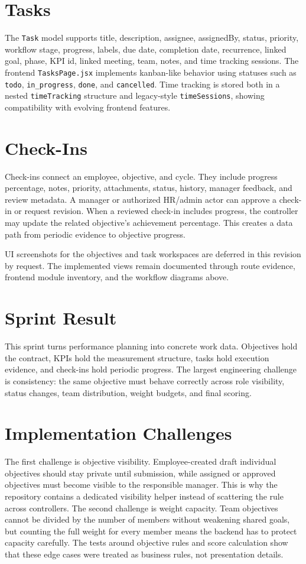 \section{Tasks}
The \texttt{Task} model supports title, description, assignee, assignedBy, status, priority, workflow stage, progress, labels, due date, completion date, recurrence, linked goal, phase, KPI id, linked meeting, team, notes, and time tracking sessions. The frontend \texttt{TasksPage.jsx} implements kanban-like behavior using statuses such as \texttt{todo}, \texttt{in\_progress}, \texttt{done}, and \texttt{cancelled}. Time tracking is stored both in a nested \texttt{timeTracking} structure and legacy-style \texttt{timeSessions}, showing compatibility with evolving frontend features.

\section{Check-Ins}
Check-ins connect an employee, objective, and cycle. They include progress percentage, notes, priority, attachments, status, history, manager feedback, and review metadata. A manager or authorized HR/admin actor can approve a check-in or request revision. When a reviewed check-in includes progress, the controller may update the related objective's achievement percentage. This creates a data path from periodic evidence to objective progress.



UI screenshots for the objectives and task workspaces are deferred in this revision by request. The implemented views remain documented through route evidence, frontend module inventory, and the workflow diagrams above.

\section{Sprint Result}
This sprint turns performance planning into concrete work data. Objectives hold the contract, KPIs hold the measurement structure, tasks hold execution evidence, and check-ins hold periodic progress. The largest engineering challenge is consistency: the same objective must behave correctly across role visibility, status changes, team distribution, weight budgets, and final scoring.

\section{Implementation Challenges}
The first challenge is objective visibility. Employee-created draft individual objectives should stay private until submission, while assigned or approved objectives must become visible to the responsible manager. This is why the repository contains a dedicated visibility helper instead of scattering the rule across controllers. The second challenge is weight capacity. Team objectives cannot be divided by the number of members without weakening shared goals, but counting the full weight for every member means the backend has to protect capacity carefully. The tests around objective rules and score calculation show that these edge cases were treated as business rules, not presentation details.
